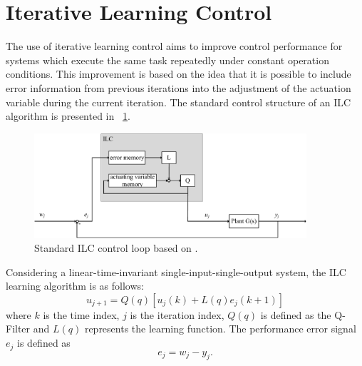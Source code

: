 \section{Iterative Learning Control}
The use of iterative learning control aims to improve control performance for systems which execute the same task repeatedly under constant operation conditions. This improvement is based on the idea that it is possible to include error information from previous iterations into the adjustment of the actuation variable during the current iteration.
The standard control structure of an ILC algorithm is presented in \figurename~\ref{fig:ILC_only}.
\begin{figure}[h]
   \centering
   \includegraphics[width=0.9\textwidth]{images/ILC_only.pdf}
   \caption[Standard ILC control loop]{Standard ILC control loop based on \cite{ILC2}.}
   \label{fig:ILC_only}
 \end{figure}
Considering a linear-time-invariant single-input-single-output system, the ILC learning algorithm is as follows:
\begin{equation}
    u_{j+1}  = Q(q)[u_{j}(k)+L(q)e_{j}(k+1)]
 \label{eq:ILC_standard}
\end{equation}
where $k$ is the time index, $j$ is the iteration index, $Q(q)$ is defined as the Q-Filter and $L(q)$ represents the learning function. The performance error signal $e_{j}$ is defined as
\begin{equation}
    e_{j}  = w_{j}-y_{j}.
 \label{eq:perf_error}
\end{equation}

